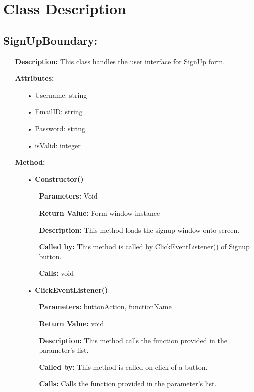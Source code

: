\documentclass{scrreprt}
\begin{document}
\section{Class Description}

\subsection{SignUpBoundary: }
\begin{enumerate}
\item[] \textbf{Description:} This class handles the user interface for SignUp form.
\item[] \textbf{Attributes:} 
\begin{itemize}
\item [•] Username: string
\item [•] EmailID: string
\item [•] Password: string
\item [•] isValid: integer
\end{itemize}
\textbf{Method:}
\begin{itemize}
\item [•] \textbf{Constructor()}
\begin{itemize}
\item [] \textbf{Parameters:} Void 
\item [] \textbf{Return Value:} Form window instance
\item [] \textbf{Description:} This method loads the signup window onto screen.
\item [] \textbf{Called by:} This method is called by ClickEventListener() of Signup button.
\item [] \textbf{Calls:} void
\end{itemize}

\item [•] \textbf{ClickEventListener()}
\begin{itemize}
\item [] \textbf{Parameters:} buttonAction, functionName 
\item [] \textbf{Return Value:} void
\item [] \textbf{Description:} This method calls the function provided in the parameter's list.
\item [] \textbf{Called by:} This method is called on click of a button.
\item [] \textbf{Calls:} Calls the function provided in the parameter's list.  
\end{itemize}


\end{itemize}
\end{enumerate}
\end{document}
